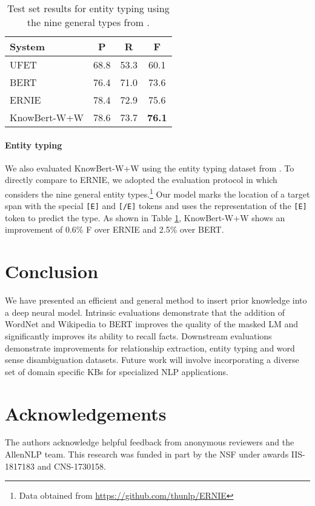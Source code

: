 \documentclass[11pt,a4paper]{article}
\newcommand{\KWANDW}[0]{KnowBert-W+W}
\newcommand{\KWANDWS}[0]{KnowBert-W+W }
\newcommand{\BBS}[0]{BERT }
\newcommand{\BB}[0]{BERT}
\begin{document}
\begin{table}
\centering
\begin{tabular}{l c c c}
\toprule
System  & P & R & F \\
 \midrule
 UFET & 68.8 & 53.3 & 60.1 \\
 \BBS & 76.4 & 71.0 & 73.6 \\
 ERNIE & 78.4 & 72.9 & 75.6 \\
 \KWANDW & 78.6 & 73.7 & \textbf{76.1} \\
\bottomrule
\end{tabular}
\caption{Test set results for entity typing using the nine general types from \cite{choi-etal-2018-ultra}.}
\label{tab:entity_typing}
\end{table}



\paragraph{Entity typing} We also evaluated \KWANDWS using the entity typing dataset from \citet{choi-etal-2018-ultra}.  To directly compare to ERNIE, we adopted the evaluation protocol in \citet{Zhang2019ERNIEEL} which considers the nine general entity types.\footnote{Data obtained from \url{https://github.com/thunlp/ERNIE}}
Our model marks the location of a target span with the special \texttt{[E]} and \texttt{[/E]} tokens and uses the representation of the \texttt{[E]} token to predict the type.
As shown in Table \ref{tab:entity_typing}, \KWANDWS shows an improvement of 0.6\%  F over ERNIE and 2.5\% over \BB.



\section{Conclusion}

We have presented an efficient and general method to insert prior knowledge into a deep neural model.
Intrinsic evaluations demonstrate that the addition of WordNet and Wikipedia to BERT improves the quality of the masked LM and significantly improves its ability to recall facts.
Downstream evaluations demonstrate improvements for relationship extraction, entity typing and word sense disambiguation datasets.
Future work will involve incorporating a diverse set of domain specific KBs for specialized NLP applications.

\section*{Acknowledgements}
The authors acknowledge helpful feedback from anonymous reviewers and the AllenNLP team.  This research was funded in part by the NSF under awards IIS-1817183 and CNS-1730158.
\end{document}
